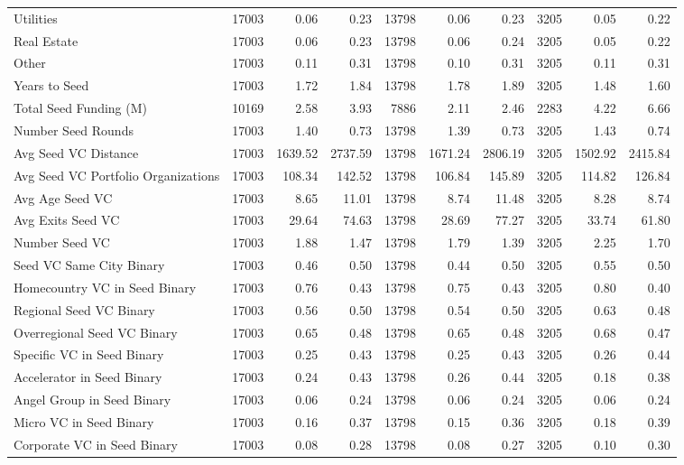 \begin{table}[!h]
{\begin{tabular}[t]{lrrrrrrrrr}
Utilities & 17003 & 0.06 & 0.23 & 13798 & 0.06 & 0.23 & 3205 & 0.05 & 0.22\\
Real Estate & 17003 & 0.06 & 0.23 & 13798 & 0.06 & 0.24 & 3205 & 0.05 & 0.22\\
Other & 17003 & 0.11 & 0.31 & 13798 & 0.10 & 0.31 & 3205 & 0.11 & 0.31\\
Years to Seed & 17003 & 1.72 & 1.84 & 13798 & 1.78 & 1.89 & 3205 & 1.48 & 1.60\\
\addlinespace
Total Seed Funding (M) & 10169 & 2.58 & 3.93 & 7886 & 2.11 & 2.46 & 2283 & 4.22 & 6.66\\
Number Seed Rounds & 17003 & 1.40 & 0.73 & 13798 & 1.39 & 0.73 & 3205 & 1.43 & 0.74\\
Avg Seed VC Distance & 17003 & 1639.52 & 2737.59 & 13798 & 1671.24 & 2806.19 & 3205 & 1502.92 & 2415.84\\
Avg Seed VC Portfolio Organizations & 17003 & 108.34 & 142.52 & 13798 & 106.84 & 145.89 & 3205 & 114.82 & 126.84\\
Avg Age Seed VC & 17003 & 8.65 & 11.01 & 13798 & 8.74 & 11.48 & 3205 & 8.28 & 8.74\\
\addlinespace
Avg Exits Seed VC & 17003 & 29.64 & 74.63 & 13798 & 28.69 & 77.27 & 3205 & 33.74 & 61.80\\
Number Seed VC & 17003 & 1.88 & 1.47 & 13798 & 1.79 & 1.39 & 3205 & 2.25 & 1.70\\
Seed VC Same City Binary & 17003 & 0.46 & 0.50 & 13798 & 0.44 & 0.50 & 3205 & 0.55 & 0.50\\
Homecountry VC in Seed Binary & 17003 & 0.76 & 0.43 & 13798 & 0.75 & 0.43 & 3205 & 0.80 & 0.40\\
Regional Seed VC Binary & 17003 & 0.56 & 0.50 & 13798 & 0.54 & 0.50 & 3205 & 0.63 & 0.48\\
\addlinespace
Overregional Seed VC Binary & 17003 & 0.65 & 0.48 & 13798 & 0.65 & 0.48 & 3205 & 0.68 & 0.47\\
Specific VC in Seed Binary & 17003 & 0.25 & 0.43 & 13798 & 0.25 & 0.43 & 3205 & 0.26 & 0.44\\
Accelerator in Seed Binary & 17003 & 0.24 & 0.43 & 13798 & 0.26 & 0.44 & 3205 & 0.18 & 0.38\\
Angel Group in Seed Binary & 17003 & 0.06 & 0.24 & 13798 & 0.06 & 0.24 & 3205 & 0.06 & 0.24\\
Micro VC in Seed Binary & 17003 & 0.16 & 0.37 & 13798 & 0.15 & 0.36 & 3205 & 0.18 & 0.39\\
\addlinespace
Corporate VC in Seed Binary & 17003 & 0.08 & 0.28 & 13798 & 0.08 & 0.27 & 3205 & 0.10 & 0.30\\

\end{tabular}}
\end{table}

